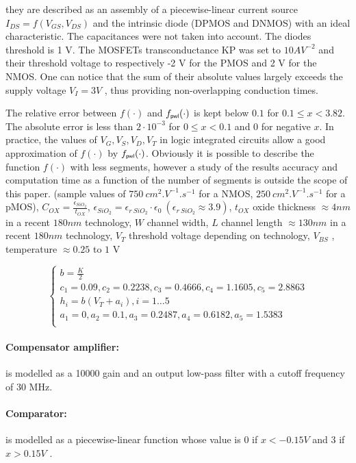 they are described as an assembly of a
piecewise-linear current source $I_{DS} = f(V_{GS}, V_{DS})$ and the intrinsic diode
(DPMOS and DNMOS) with an ideal characteristic.
The capacitances were not taken into account. The diodes threshold is
1 V. The MOSFETs transconductance KP was set to $10 AV^{-2}$ and
their threshold voltage to respectively -2 V for the PMOS and 2 V for
the NMOS. One can notice that the sum of their absolute values largely
exceeds the supply voltage $V_{I} = 3 V$ , thus providing non-overlapping
conduction times.

The relative error between $f(\cdot)$ and $f_\pwl(\cdot)$ is kept below $0.1$ for $0.1 \leq x < 3.82$. The absolute error is less than $2 \cdot 10^{-3}$ for $0 \leq x < 0.1$ and $0$ for negative $x$. In practice, the values of $V_G,V_S,V_D,V_T$ in logic integrated circuits allow  a good approximation of $f(\cdot)$ by $f_\pwl(\cdot)$. Obviously it is possible to describe the function $f(\cdot)$ with less segments, however a study of the results accuracy and computation time as a function of the number of segments is outside the scope of this paper. 
(sample values of $750~cm^2.V^{-1}.s^{-1}$ for a NMOS, $250~cm^2.V^{-1}.s^{-1}$ for a pMOS), $C_{OX} = \frac{\epsilon_{SiO_2}}{t_{OX}}$, $\epsilon_{SiO_2} = \epsilon_{r~SiO_2} \cdot \epsilon_0 \ (\epsilon_{r~SiO_2} \approx 3.9)$, $t_{OX}$ oxide thickness $\approx 4 nm$ in a recent $180 nm$ technology, $W$ channel width, $L$ channel length $\approx 130 nm$ in a recent $180 nm$ technology, $V_T$ threshold voltage depending on technology, $V_{BS}$ , temperature $\approx 0.25$ to $1$ V

\begin{equation}
  \label{eq:70}
 \left\{ \begin{array}{l}
  b = \frac{K}{2} \\
  c_1 = 0.09 , c_2=0.2238 , c_3=0.4666 , c_4=1.1605 , c_5=2.8863 \\
  h_i = b(V_T+a_i), i =1\ldots 5 \\
  a_1 = 0 , a_2=0.1, a_3=0.2487 , a_4=0.6182 , a_5=1.5383 \\
\end{array}\right.
\end{equation}

\paragraph{Compensator amplifier:} is modelled as a 10000 gain and an output low-pass
filter with a cutoff frequency of 30 MHz.
\paragraph{Comparator:} is modelled as a piecewise-linear function whose value is 0 if
$x < -0.15V$ and 3 if $x > 0.15V$ .
